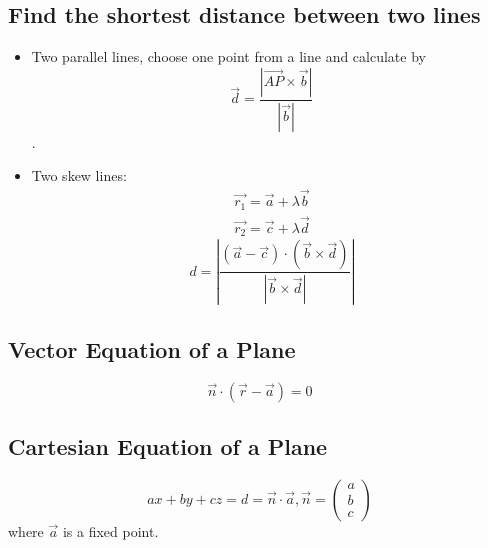 \documentclass[a4paper,9pt]{scrartcl}
\newcommand{\vecabs}[1]{\left| \vec{#1} \right|}
\newcommand{\abs}[1]{\left| #1 \right|}
\begin{document}
    \subsection{Find the shortest distance between two lines}
    \begin{itemize}
        \item Two parallel lines, choose one point from a line and calculate by
        \begin{displaymath}
            \vec{d} = \frac{\abs{\vec{AP}\times\vec{b}}}{\vecabs{b}}
        \end{displaymath}.

        \item Two skew lines:
        \begin{align}
            \vec{r_1} = \vec{a} + {\lambda}\vec{b} \\
            \vec{r_2} = \vec{c} + {\lambda}\vec{d}
        \end{align}
        \begin{displaymath}
            d = \abs{\frac{\left( \vec{a}-\vec{c} \right)\cdot\left( \vec{b}\times\vec{d} \right)}{\abs{\vec{b}\times\vec{d}}}}
        \end{displaymath}
    \end{itemize}

    \subsection{Vector Equation of a Plane}
    \begin{displaymath}
        \vec{n}\cdot\left( \vec{r} - \vec{a} \right) = 0
    \end{displaymath}

    \subsection{Cartesian Equation of a Plane}
    \begin{displaymath}
        ax + by + cz = d = \vec{n}\cdot\vec{a}, \vec{n}=\begin{pmatrix}
                                                            a \\
                                                            b \\
                                                            c
        \end{pmatrix}
    \end{displaymath} where $\vec{a}$ is a fixed point.
\end{document}
